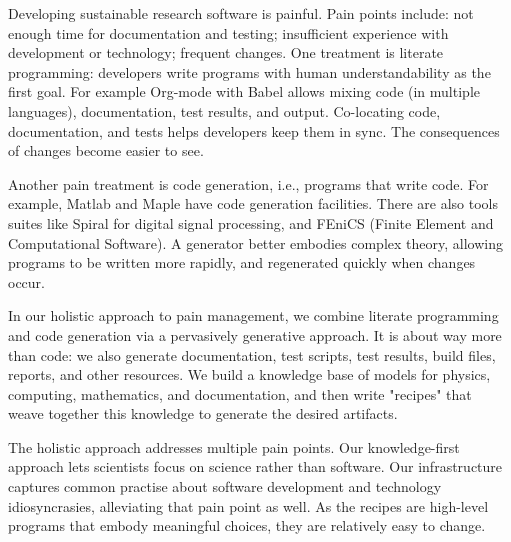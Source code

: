 Developing sustainable research software is painful.  Pain points include:
not enough time for documentation and testing; insufficient experience
with development or technology; frequent changes.  One treatment is
literate programming: developers write programs with human understandability as
the first goal. For example Org-mode with Babel allows mixing code
(in multiple languages), documentation, test results, and output.
Co-locating code, documentation, and tests helps developers keep them in sync.
The consequences of changes become easier to see.

Another pain treatment is code generation, i.e., programs that
write code.  For example, Matlab and Maple have code
generation facilities. There are also tools suites like Spiral for digital
signal processing, and FEniCS (Finite Element and Computational Software).
A generator better embodies complex theory, allowing programs to be
written more rapidly, and regenerated quickly when changes occur.

In our holistic approach to pain management, we combine literate programming and
code generation via a pervasively generative approach.  It is about way more
than code: we also generate documentation, test scripts, test results, build
files, reports, and other resources. We build a knowledge base of models for
physics, computing, mathematics, and documentation, and then write "recipes"
that weave together this knowledge to generate the desired artifacts.

The holistic approach addresses multiple pain points.  Our knowledge-first
approach lets scientists focus on science rather than software. Our
infrastructure captures common practise about software development and
technology idiosyncrasies, alleviating that pain point as well.  As the recipes
are high-level programs that embody meaningful choices, they are relatively
easy to change.
